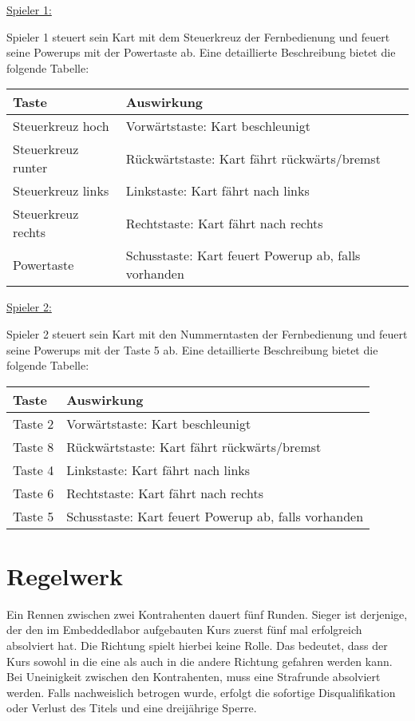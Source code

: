 \underline{Spieler 1:}

Spieler 1 steuert sein Kart mit dem Steuerkreuz der Fernbedienung und feuert seine Powerups mit der Powertaste ab. Eine detaillierte Beschreibung bietet die folgende Tabelle:

\vspace{0.5cm}
\begin{tabular}{|l|l|}
\hline
\textbf{Taste} & \textbf{Auswirkung} \\ \hline
Steuerkreuz hoch & Vorwärtstaste: Kart beschleunigt \\ \hline
Steuerkreuz runter & Rückwärtstaste: Kart fährt rückwärts/bremst \\ \hline
Steuerkreuz links & Linkstaste: Kart fährt nach links \\ \hline
Steuerkreuz rechts & Rechtstaste: Kart fährt nach rechts \\ \hline
Powertaste & Schusstaste: Kart feuert Powerup ab, falls vorhanden \\ \hline  
\end{tabular} 
\vspace{0.5cm}

\underline{Spieler 2:}
 
Spieler 2 steuert sein Kart mit den Nummerntasten der Fernbedienung und feuert seine Powerups mit der Taste 5 ab. Eine detaillierte Beschreibung bietet die folgende Tabelle:

\vspace{0.5cm}
\begin{tabular}{|l|l|}
\hline
\textbf{Taste} & \textbf{Auswirkung} \\ \hline
Taste 2 & Vorwärtstaste: Kart beschleunigt \\ \hline
Taste 8 & Rückwärtstaste: Kart fährt rückwärts/bremst \\ \hline
Taste 4 & Linkstaste: Kart fährt nach links \\ \hline
Taste 6 & Rechtstaste: Kart fährt nach rechts \\ \hline
Taste 5 & Schusstaste: Kart feuert Powerup ab, falls vorhanden \\ \hline 
\end{tabular}
\vspace{0.5cm}

\section{Regelwerk}
Ein Rennen zwischen zwei Kontrahenten dauert fünf Runden. Sieger ist derjenige, der den im Embeddedlabor aufgebauten Kurs zuerst fünf mal erfolgreich absolviert hat. Die Richtung spielt hierbei keine Rolle. Das bedeutet, dass der Kurs sowohl in die eine als auch in die andere Richtung gefahren werden kann. Bei Uneinigkeit zwischen den Kontrahenten, muss eine Strafrunde absolviert werden. Falls nachweislich betrogen wurde, erfolgt die sofortige Disqualifikation oder Verlust des Titels und eine dreijährige Sperre. 

